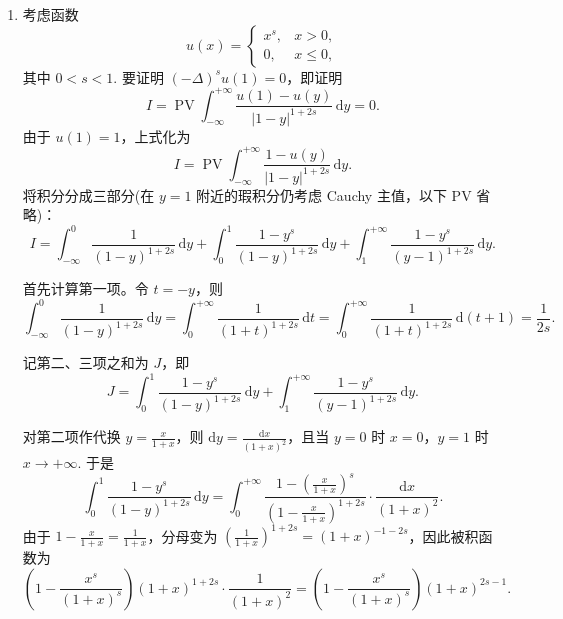\begin{solution}
\begin{enumerate}
        \item[3.]
        考虑函数
        \[
        u(x) = 
        \begin{cases}
        x^{s}, & x > 0, \\
        0, & x \leq 0,
        \end{cases}
        \]
        其中 \(0 < s < 1\). 要证明 \((-\Delta)^{s}u(1) = 0\)，即证明
        \[
        I = \operatorname{PV} \int_{-\infty}^{+\infty} \frac{u(1)-u(y)}{\left|1-y\right|^{1+2s}} \,\mathrm{d}y = 0.
        \]
        由于 \(u(1)=1\)，上式化为
        \[
        I = \operatorname{PV} \int_{-\infty}^{+\infty} \frac{1-u(y)}{\left|1-y\right|^{1+2s}} \,\mathrm{d}y.
        \]
        将积分分成三部分(在 $y=1$ 附近的瑕积分仍考虑 Cauchy 主值，以下 $\mathrm{PV}$ 省略)：
        \[
        I = \int_{-\infty}^{0} \frac{1}{\left(1-y\right)^{1+2s}} \,\mathrm{d}y + \int_{0}^{1} \frac{1-y^{s}}{\left(1-y\right)^{1+2s}} \,\mathrm{d}y + \int_{1}^{+\infty} \frac{1-y^{s}}{\left(y-1\right)^{1+2s}} \,\mathrm{d}y.
        \]

        首先计算第一项。令 \(t = -y\)，则
        \[
        \int_{-\infty}^{0} \frac{1}{\left(1-y\right)^{1+2s}} \,\mathrm{d}y = \int_{0}^{+\infty} \frac{1}{\left(1+t\right)^{1+2s}} \,\mathrm{d}t = \int_{0}^{+\infty} \frac{1}{\left(1+t\right)^{1+2s}} \,\mathrm{d}(t+1) = \frac{1}{2s}.
        \]

        记第二、三项之和为 \(J\)，即
        \[
        J = \int_{0}^{1} \frac{1-y^{s}}{\left(1-y\right)^{1+2s}} \,\mathrm{d}y + \int_{1}^{+\infty} \frac{1-y^{s}}{\left(y-1\right)^{1+2s}} \,\mathrm{d}y.
        \]

        对第二项作代换 \(\displaystyle y = \frac{x}{1+x}\)，则 \(\displaystyle \mathrm{d}y = \frac{\mathrm{d}x}{\left(1+x\right)^{2}}\)，且当 \(y=0\) 时 \(x=0\)，\(y=1\) 时 \(x \to +\infty\). 于是
        \[
        \int_{0}^{1} \frac{1-y^{s}}{\left(1-y\right)^{1+2s}} \,\mathrm{d}y = \int_{0}^{+\infty} \frac{1-\left(\frac{x}{1+x}\right)^{s}}{\left(1-\frac{x}{1+x}\right)^{1+2s}} \cdot \frac{\mathrm{d}x}{\left(1+x\right)^{2}}.
        \]
        由于 \(\displaystyle 1-\frac{x}{1+x} = \frac{1}{1+x}\)，分母变为 \(\displaystyle \left(\frac{1}{1+x}\right)^{1+2s} = \left(1+x\right)^{-1-2s}\)，因此被积函数为
        \[
        \left(1-\frac{x^{s}}{\left(1+x\right)^{s}}\right) \left(1+x\right)^{1+2s} \cdot \frac{1}{\left(1+x\right)^{2}} = \left(1-\frac{x^{s}}{\left(1+x\right)^{s}}\right) \left(1+x\right)^{2s-1}.
        \]


\end{enumerate}
\end{solution}
